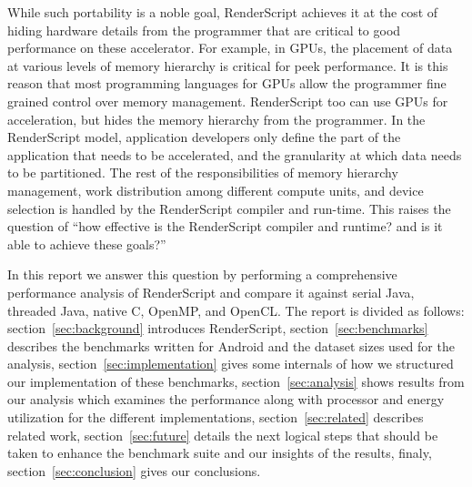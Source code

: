 While such portability is a noble goal, RenderScript achieves it at the cost of
hiding hardware details from the programmer that are critical to good
performance on these accelerator. For example, in GPUs, the placement of data at
various levels of memory hierarchy is critical for peek performance.  It is this
reason that most programming languages for GPUs allow the programmer fine grained
control over memory management. RenderScript too can use GPUs for acceleration,
but hides the memory hierarchy from the programmer. In the
RenderScript model, application developers only define the part of the
application that needs to be accelerated, and the granularity at which data
needs to be partitioned. The rest of the responsibilities of memory
hierarchy management, work distribution among different compute units, and device selection
is handled by the RenderScript compiler and run-time. 
This raises the question of ``how
effective is the RenderScript compiler and runtime? and is it able to achieve these goals?''

In this report we answer this question 
by performing a comprehensive performance analysis of RenderScript and compare it against 
serial Java, threaded Java, native C, OpenMP, and OpenCL.
The report is divided as follows: section~\ref{sec:background} introduces 
RenderScript, section~\ref{sec:benchmarks} describes the benchmarks written for Android and the dataset sizes
used for the analysis,
section~\ref{sec:implementation} gives some internals of how we structured our implementation of these benchmarks,
section~\ref{sec:analysis} shows results from our analysis which
    examines the performance along with processor and energy utilization for the different implementations,
section~\ref{sec:related} describes related work,
section~\ref{sec:future} details the next logical steps that should be taken to enhance the benchmark suite and our insights of the results,
finaly, section~\ref{sec:conclusion} gives our conclusions.
